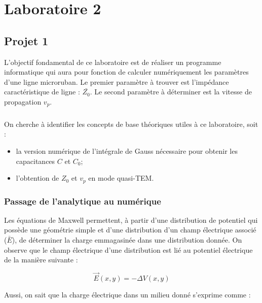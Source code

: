 



\label{s:experimentation}
\chapter{Laboratoire 2}
\section{Projet 1}

L'objectif fondamental de ce laboratoire est de réaliser un programme informatique qui aura pour fonction de calculer numériquement les paramètres d'une ligne microruban. Le premier paramètre à trouver est l'impédance caractéristique de ligne : $\bar{Z_0}$. Le second paramètre à déterminer est la vitesse de propagation $v_p$.

\paragraph{}
On cherche à identifier les concepts de base théoriques utiles à ce laboratoire, soit :

\begin{itemize}
\item la version numérique de l'intégrale de Gauss nécessaire pour obtenir les capacitances $C$ et $C_0$;
\item l'obtention de $Z_0$ et $v_p$ en mode quasi-TEM.
\end{itemize}

\subsection{Passage de l'analytique au numérique}
Les équations de Maxwell permettent, à partir d'une distribution de potentiel qui possède une géométrie simple et d'une distribution d'un champ électrique associé ($\bar{E}$), de déterminer la charge emmagasinée dans une distribution donnée. On observe que le champ électrique d'une distribution est lié au potentiel électrique de la manière suivante :

\begin{equation}
	\vec{E}(x,y) = - \Delta V(x,y)
\end{equation}

Aussi, on sait que la charge électrique dans un milieu donné s'exprime comme : 

